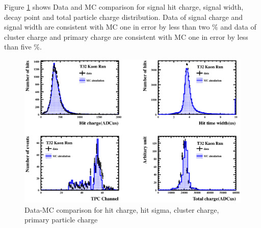 Figure \ref{KsomeQuantities} shows Data and MC comparison for signal hit charge, signal width, decay point and total particle charge distribution.
Data of signal charge and signal width are consistent with MC one in error by less than two $\%$ and data of cluster charge and primary charge are consistent with  
MC one in error by less than five $\%$.


\begin{figure}[htbp]
  \begin{center}
    \includegraphics[width=1.0\hsize]{fig/cHit4_hough.eps}
  \end{center}    
    \caption{Data-MC comparison for hit charge, hit sigma, cluster charge, primary particle charge}
    \label{KsomeQuantities}
\end{figure}


